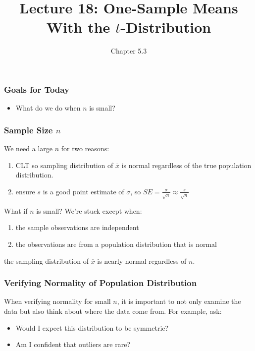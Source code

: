 \documentclass[handout]{beamer}
\title{Lecture 18: One-Sample Means With the $t$-Distribution}
\author{Chapter 5.3}
\date{}
\newcommand{\blue}[1]{\textcolor{blue2}{#1}}
\newcommand{\xbar}{\overline{x}}
\begin{document}
\begin{frame}
\titlepage
\end{frame}


\begin{frame}[fragile]
\frametitle{Goals for Today}

\begin{itemize}
\item What do we do when $n$ is small?  
\end{itemize}

\end{frame}


\begin{frame}[fragile]
\frametitle{Sample Size $n$}
%
%
We need a \blue{large $n$} for two reasons:

\begin{enumerate}
\item CLT so sampling distribution of $\xbar$ is normal regardless of the true population distribution. 
\item ensure $s$ is a good point estimate of $\sigma$, so $SE = \frac{\sigma}{\sqrt{n}} \approx \frac{s}{\sqrt{n}}$
\end{enumerate}

\pause \vspace{0.5cm}

What if $n$ is small?  We're stuck \blue{except when}: 
\begin{enumerate}
\item the sample observations are independent
\item the observations are from a population distribution that is normal
\end{enumerate}
the sampling distribution of $\xbar$ is nearly normal \blue{regardless} of $n$.

\end{frame}


\begin{frame}[fragile]
\frametitle{Verifying Normality of Population Distribution}

When verifying normality for small $n$, it is important to not only examine the data but also think about where the data come from. For example, ask:
\begin{itemize}
\item Would I expect this distribution to be symmetric?
\item Am I confident that outliers are rare?
\end{itemize}

\end{frame}
\end{document}
